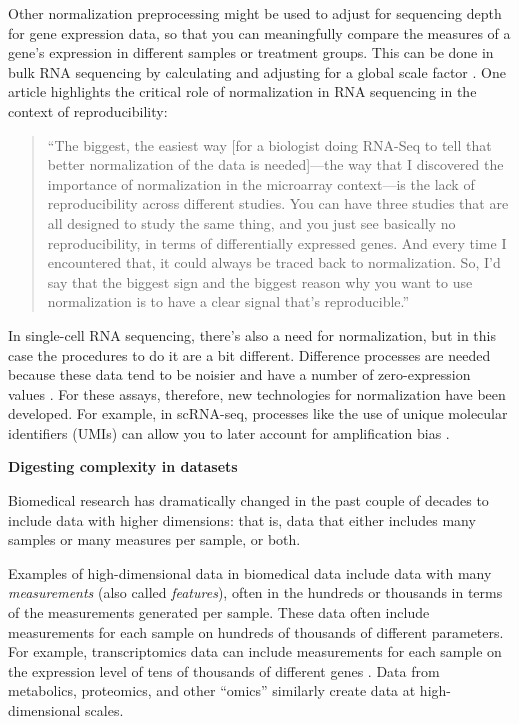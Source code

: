 \documentclass[]{tufte-book}
\begin{document}
Other normalization preprocessing might be used to adjust for sequencing depth
for gene expression data, so that you can meaningfully compare the measures of a
gene's expression in different samples or treatment groups.
This can be done in bulk RNA sequencing by calculating and adjusting for a
global scale factor \citep{bacher2017scnorm}. One article highlights the critical
role of normalization in RNA sequencing in the context of reproducibility:

\begin{quote}
``The biggest, the easiest way {[}for a biologist doing RNA-Seq to tell that
better normalization of the data is needed{]}---the way that I discovered the
importance of normalization in the microarray context---is the lack of
reproducibility across different studies. You can have three studies that are
all designed to study the same thing, and you just see basically no
reproducibility, in terms of differentially expressed genes. And every time I
encountered that, it could always be traced back to normalization. So, I'd say
that the biggest sign and the biggest reason why you want to use normalization
is to have a clear signal that's reproducible.'' \citep{mak2011john}
\end{quote}

In single-cell RNA sequencing, there's also a need for normalization, but in
this case the procedures to do it are a bit different. Difference processes are
needed because these data tend to be noisier and have a number of
zero-expression values \citep{perkel2017single, bacher2017scnorm}. For these assays, therefore, new technologies for
normalization have been developed. For example, in scRNA-seq, processes like the
use of unique molecular identifiers (UMIs) can allow you to later account for
amplification bias \citep{haque2017practical}.

\textbf{Digesting complexity in datasets}

Biomedical research has dramatically changed in the past couple of decades to
include data with higher dimensions: that is, data that either includes many
samples or many measures per sample, or both.

Examples of high-dimensional data in biomedical data include data with many
\emph{measurements} (also called \emph{features}), often in the hundreds or thousands in
terms of the measurements generated per sample. These data often include
measurements for each sample on hundreds of thousands of different parameters.
For example, transcriptomics data can include measurements for each sample on
the expression level of tens of thousands of different genes
\citep{perkel2017single}. Data from metabolics, proteomics, and other ``omics''
similarly create data at high-dimensional scales.
\end{document}
